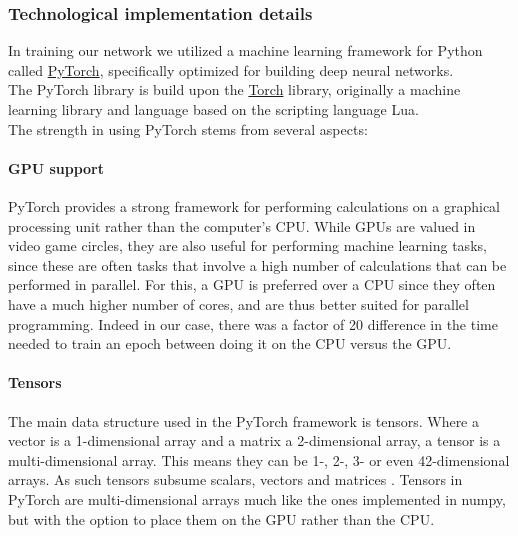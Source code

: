 \begin{multicols}{2}
\subsubsection{Technological implementation details}
In training our network we utilized a machine learning framework for Python called \href{https://pytorch.org/}{PyTorch}, specifically optimized for building deep neural networks. \\
The PyTorch library is build upon the \href{http://torch.ch/}{Torch} library, originally a machine learning library and language based on the scripting language Lua.\\
The strength in using PyTorch stems from several aspects:
\paragraph{GPU support}
PyTorch provides a strong framework for performing calculations on a graphical processing unit rather than the computer's CPU. While GPUs are valued in video game circles, they are also useful for performing machine learning tasks, since these are often tasks that involve a high number of calculations that can be performed in parallel. For this, a GPU is preferred over a CPU since they often have a much higher number of cores, and are thus better suited for parallel programming. Indeed in our case, there was a factor of 20 difference in the time needed to train an epoch between doing it on the CPU versus the GPU.
\paragraph{Tensors}
The main data structure used in the PyTorch framework is tensors. Where a vector is a 1-dimensional array and a matrix a 2-dimensional array, a tensor is a multi-dimensional array. This means they can be 1-, 2-, 3- or even 42-dimensional arrays. As such tensors subsume scalars, vectors and matrices \citep[p. 211]{goodfellow-et-al-2016}. Tensors in PyTorch are multi-dimensional arrays much like the ones implemented in numpy, but with the option to place them on the GPU rather than the CPU.

\end{multicols}
